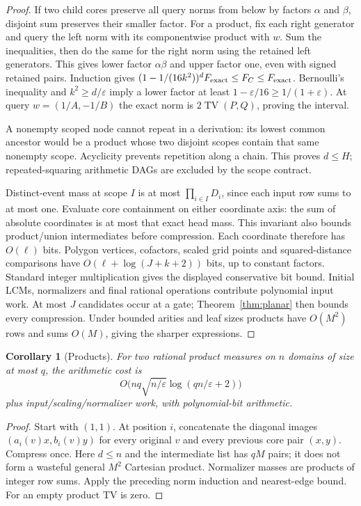 \documentclass[11pt]{article}
\newtheorem{corollary}{Corollary}
\newcommand{\TV}{\operatorname{TV}}
\begin{document}
\begin{proof}
If two child cores preserve all query norms from below by factors $\alpha$
and $\beta$, disjoint sum preserves their smaller factor. For a product,
fix each right generator and query the left norm with its componentwise
product with $w$. Sum the inequalities, then do the same for the right
norm using the retained left generators. This gives lower factor
$\alpha\beta$ and upper factor one, even with signed retained pairs.
Induction gives $(1-1/(16k^2))^d F_{\rm exact}\leq F_C\leq F_{\rm exact}$.
Bernoulli's inequality and $k^2\geq d/\varepsilon$ imply a lower factor
at least $1-\varepsilon/16\geq1/(1+\varepsilon)$.
At query $w=(1/A,-1/B)$ the exact norm is $2\TV(P,Q)$, proving the interval.

A nonempty scoped node cannot repeat in a derivation: its lowest common
ancestor would be a product whose two disjoint scopes contain that same
nonempty scope. Acyclicity prevents repetition along a chain. This proves
$d\leq H$; repeated-squaring arithmetic DAGs are excluded by the scope contract.

Distinct-event mass at scope $I$ is at most $\prod_{i\in I}D_i$, since each
input row sums to at most one. Evaluate core containment on either coordinate
axis: the sum of absolute coordinates is at most that exact head mass.
This invariant also bounds product/union intermediates before compression.
Each coordinate therefore has $O(\ell)$ bits. Polygon vertices, cofactors,
scaled grid points and squared-distance comparisons have
$O(\ell+\log(J+k+2))$ bits, up to constant factors. Standard integer
multiplication gives the displayed conservative bit bound. Initial LCMs,
normalizers and final rational operations contribute polynomial input work.
At most $J$ candidates occur at a gate; Theorem~\ref{thm:planar} then bounds
every compression. Under bounded arities and leaf sizes products have $O(M^2)$
rows and sums $O(M)$, giving the sharper expressions.
\end{proof}

\begin{corollary}[Products]\label{cor:products}
For two rational product measures on $n$ domains of size at most $q$, the
arithmetic cost is
\[
 O\bigl(nq\sqrt{n/\varepsilon}\log(qn/\varepsilon+2)\bigr)
\]
plus input/scaling/normalizer work, with polynomial-bit arithmetic.
\end{corollary}
\begin{proof}
Start with $(1,1)$. At position $i$, concatenate the diagonal images
$(a_i(v)x,b_i(v)y)$ for every original $v$ and every previous core pair
$(x,y)$. Compress once. Here $d\leq n$ and the intermediate list has $qM$
pairs; it does not form a wasteful general $M^2$ Cartesian product.
Normalizer masses are products of integer row sums. Apply the preceding
norm induction and nearest-edge bound. For an empty product TV is zero.
\end{proof}
\end{document}
